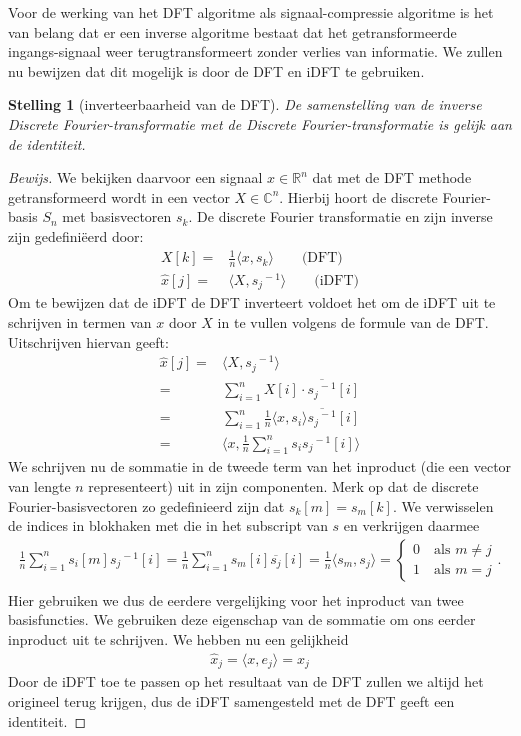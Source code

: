 \documentclass[11pt]{report}
\newcommand{\R}{\mathbb{R}}
\newcommand{\C}{\mathbb{C}}
\newtheorem*{stelling}{Stelling}
\theoremstyle{remark}
\newcommand{\eq}[1]{\begin{eqnarray*} #1 \end{eqnarray*}}
\newcommand{\repr}[1]{{#1}^{\!\!-1}}
\newcommand{\inpr}[2]{\langle #1 , #2 \rangle}
\begin{document}
Voor de werking van het DFT algoritme als signaal-compressie algoritme is het van belang dat er een 
inverse algoritme bestaat dat het getransformeerde ingangs-signaal weer terugtransformeert 
zonder verlies van informatie. We zullen nu bewijzen dat dit mogelijk is door de DFT en iDFT te gebruiken.

\begin{stelling}[inverteerbaarheid van de DFT]
  De samenstelling van de inverse Discrete Fourier-transformatie met de Discrete Fourier-transformatie is
  gelijk aan de identiteit.
\end{stelling}
\begin{proof}[Bewijs]
We bekijken daarvoor een signaal $x\in\R^n$ dat met de DFT methode getransformeerd wordt in een vector $X\in\C^n$.
Hierbij hoort de discrete Fourier-basis $S_n$ met basisvectoren $s_k$. 
De discrete Fourier transformatie en zijn inverse zijn gedefini\"eerd door:
\eq{
  X[k]      =& \tfrac 1 n \langle x, s_k \rangle \quad\quad \text{(DFT)}\\
  \hat x[j] =&  \langle X, \repr{s_j} \rangle \quad\quad\text{(iDFT)}
}
Om te bewijzen dat de iDFT de DFT inverteert voldoet het om de iDFT uit te schrijven in termen van $x$ 
door $X$ in te vullen volgens de formule van de DFT. Uitschrijven hiervan geeft:
\eq{
  \hat x[j] =&  \langle X , \repr{s_j} \rangle \\
      =&  \sum_{i=1}^n X[i]\cdot \overline{\repr{s_j}}[i] \\
      =&  \sum_{i=1}^n \tfrac1n\inpr{x}{s_i} \overline{\repr{s_j}}[i] \\
      =& \langle x , \frac1n \sum_{i=1}^n s_i \repr{s_j}[i] \rangle
}
We schrijven nu de sommatie in de tweede term van het inproduct (die een vector van lengte $n$ representeert) uit in zijn componenten. 
Merk op dat de discrete Fourier-basisvectoren zo gedefinieerd zijn dat $s_k[m] = s_m[k]$. 
We verwisselen de indices in blokhaken met die in het subscript van $s$ en verkrijgen daarmee
\eq{
  \frac1n \sum_{i=1}^n s_i[m] \repr{s_j}[i] = \frac1n \sum_{i=1}^n s_m[i] \overline{s_j}[i] 
=\tfrac1n \inpr{s_m}{s_j} = \begin{cases}0\quad\text{als }m\neq j\\1\quad\text{als }m=j\end{cases}.\\
}
Hier gebruiken we dus de eerdere vergelijking voor het inproduct van twee basisfuncties.
We gebruiken deze eigenschap van de sommatie om ons eerder inproduct uit te schrijven. 
We hebben nu een gelijkheid
\eq{
  \hat x_j = \inpr{x}{e_j} = x_j
}
Door de iDFT toe te passen op het resultaat van de DFT zullen we altijd het origineel terug krijgen,
dus de iDFT samengesteld met de DFT geeft een identiteit.
\end{proof}
\end{document}
